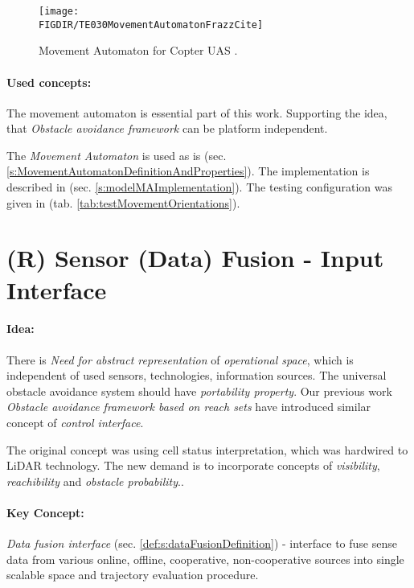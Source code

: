 \begin{figure}[H]
    \centering
    \texttt{[image: \\FIGDIR/TE030MovementAutomatonFrazzCite]} 
    \caption{Movement Automaton for Copter UAS \cite{frazzoli2001robust}.}
    \label{fig:movementAutomatonExampleTheory}
\end{figure}

\paragraph{Used concepts:} The movement automaton is essential part of this work. Supporting the idea, that \emph{Obstacle avoidance framework} can be platform independent. 

The \emph{Movement Automaton} is used as is (sec. \ref{s:MovementAutomatonDefinitionAndProperties}). The implementation is described in (sec. \ref{s:modelMAImplementation}). The testing configuration was given in (tab. \ref{tab:testMovementOrientations}).


\section{(R) Sensor (Data) Fusion - Input Interface}\label{s:dataFusionProbabilisticModelTheory}
\paragraph{Idea:}  There is \emph{Need for abstract representation} of \emph{operational space}, which is independent of used sensors, technologies, information sources. The universal obstacle avoidance system should have \emph{portability property}. Our previous work \emph{Obstacle avoidance framework based on reach sets} \cite{gomola2017obstacle} have introduced similar concept of \emph{control interface}.

The original concept was using cell status interpretation, which was hardwired to LiDAR technology.  The new demand is to incorporate concepts of \emph{visibility}, \emph{reachibility} and \emph{obstacle probability}.. 

\paragraph{Key Concept:} \emph{Data fusion interface} (sec. \ref{def:s:dataFusionDefinition}) - interface to fuse sense data from various online, offline, cooperative, non-cooperative sources into single scalable {space and trajectory evaluation procedure}.
    
